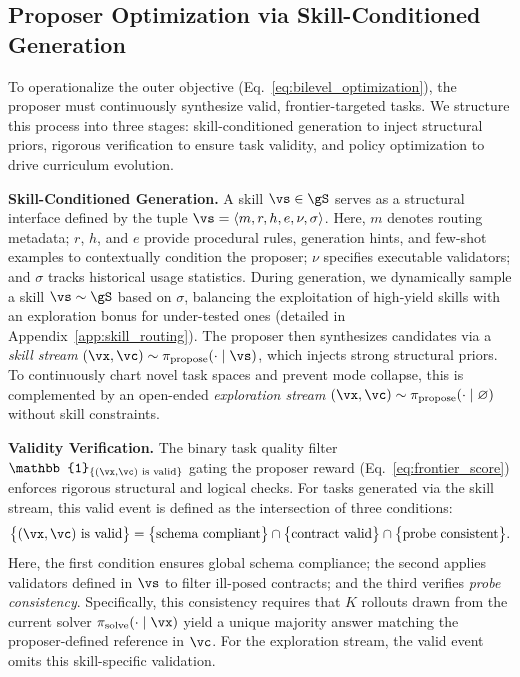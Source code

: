 \subsection{Proposer Optimization via Skill-Conditioned Generation}
\label{sec:proposer_optimization}

To operationalize the outer objective (Eq.~\ref{eq:bilevel_optimization}), the proposer must continuously synthesize valid, frontier-targeted tasks. We structure this process into three stages: skill-conditioned generation to inject structural priors, rigorous verification to ensure task validity, and policy optimization to drive curriculum evolution.

\textbf{Skill-Conditioned Generation.}
A skill $\vs \in \gS$ serves as a structural interface defined by the tuple $\vs = \langle m, r, h, e, \nu, \sigma \rangle$. Here, $m$ denotes routing metadata; $r$, $h$, and $e$ provide procedural rules, generation hints, and few-shot examples to contextually condition the proposer; $\nu$ specifies executable validators; and $\sigma$ tracks historical usage statistics. During generation, we dynamically sample a skill $\vs \sim \gS$ based on $\sigma$, balancing the exploitation of high-yield skills with an exploration bonus for under-tested ones (detailed in Appendix~\ref{app:skill_routing}). The proposer then synthesizes candidates via a \emph{skill stream} $(\vx,\vc) \sim \pi_\text{propose}(\cdot \mid \vs)$, which injects strong structural priors. To continuously chart novel task spaces and prevent mode collapse, this is complemented by an open-ended \emph{exploration stream} $(\vx,\vc) \sim \pi_\text{propose}(\cdot \mid \varnothing)$ without skill constraints.

\textbf{Validity Verification.}
The binary task quality filter $\mathbb{1}_{\{(\vx,\vc) \text{ is valid}\}}$ gating the proposer reward (Eq.~\ref{eq:frontier_score}) enforces rigorous structural and logical checks. For tasks generated via the skill stream, this valid event is defined as the intersection of three conditions:
\begin{equation}\label{eq:valid-task-indicator}
    \big\{(\vx,\vc) \text{ is valid}\big\} = \big\{\text{schema compliant}\big\} \cap \big\{\text{contract valid}\big\} \cap \big\{\text{probe consistent}\big\}.
\end{equation}
Here, the first condition ensures global schema compliance; the second applies validators defined in $\vs$ to filter ill-posed contracts; and the third verifies \emph{probe consistency}. Specifically, this consistency requires that $K$ rollouts drawn from the current solver $\pi_\text{solve}(\cdot \mid \vx)$ yield a unique majority answer matching the proposer-defined reference in $\vc$. For the exploration stream, the valid event omits this skill-specific validation.


